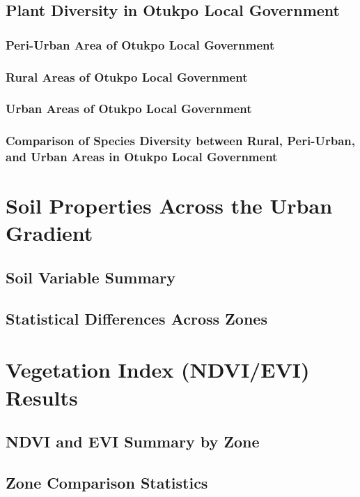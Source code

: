 \subsection{Plant Diversity in Otukpo Local Government}
\label{subsection:3-2-2}
\subsubsection{Peri-Urban Area of Otukpo Local Government}
\label{subsubsection:3-2-2-2}
\subsubsection{Rural Areas of Otukpo Local Government}
\label{subsubsection:3-2-2-1}
\subsubsection{Urban Areas of Otukpo Local Government}
\label{subsubsection:3-2-2-3}
\subsubsection{Comparison of Species Diversity between Rural, Peri-Urban, and Urban Areas in Otukpo Local Government}
\label{subsubsection:3-2-2-4}
\section{Soil Properties Across the Urban Gradient}
\label{section:3-3}
\subsection{Soil Variable Summary}
\label{subsection:3-3-1}
\subsection{Statistical Differences Across Zones}
\label{subsection:3-3-2}
\section{Vegetation Index (NDVI/EVI) Results}
\label{section:3-4}
\subsection{NDVI and EVI Summary by Zone}
\label{subsection:3-4-1}
\subsection{Zone Comparison Statistics}
\label{subsection:3-4-2}
